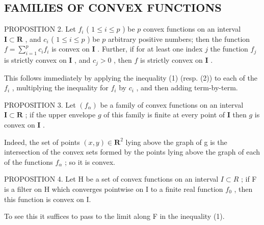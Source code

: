 \subsection{FAMILIES OF CONVEX FUNCTIONS}

PROPOSITION 2. Let \(f_{i}\) ( \(1 \leqslant i \leqslant p\) ) be \(p\) convex functions on an interval \(\mathbf{I} \subset \mathbf{R}\) , and \(c_{i}\) ( \(1 \leqslant i \leqslant p\) ) be \(p\) arbitrary positive numbers; then the function \(f = \sum_{i=1}^{p} c_{i} f_{i}\) is convex on \(\mathbf{I}\) . Further, if for at least one index \(j\) the function \(f_{j}\) is strictly convex on \(\mathbf{I}\) , and \(c_{j} > 0\) , then \(f\) is strictly convex on \(\mathbf{I}\) .

This follows immediately by applying the inequality (1) (resp. (2)) to each of the \(f_{i}\) , multiplying the inequality for \(f_{i}\) by \(c_{i}\) , and then adding term-by-term.

PROPOSITION 3. Let \((f_{\alpha})\) be a family of convex functions on an interval \(\mathbf{I} \subset \mathbf{R}\) ; if the upper envelope \(g\) of this family is finite at every point of \(\mathbf{I}\) then \(g\) is convex on \(\mathbf{I}\) .

Indeed, the set of points \((x, y) \in \mathbf{R}^{2}\) lying above the graph of g is the intersection of the convex sets formed by the points lying above the graph of each of the functions \(f_{\alpha}\) ; so it is convex.

PROPOSITION 4. Let H be a set of convex functions on an interval \(I \subset R\) ; if F is a filter on H which converges pointwise on I to a finite real function \(f_{0}\) , then this function is convex on I.

To see this it suffices to pass to the limit along F in the inequality (1).
\relax{}
